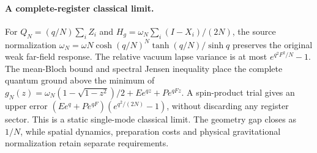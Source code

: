 \paragraph{A complete-register classical limit.}
For $Q_N=(q/N)\sum_i Z_i$ and
$H_g=\omega_N\sum_i(I-X_i)/(2N)$, the source normalization
$\omega_N=\omega N\cosh(q/N)^N\tanh(q/N)/\sinh q$
preserves the original weak far-field response. The relative vacuum lapse
variance is at most $e^{q^2F^2/N}-1$. The mean-Bloch bound and spectral
Jensen inequality place the complete quantum ground above the minimum of
$g_N(z)=\omega_N(1-\sqrt{1-z^2})/2+Ee^{qz}+Pe^{qFz}$.
A spin-product trial gives an upper error
$(Ee^q+Pe^{qF})(e^{q^2/(2N)}-1)$, without discarding any register sector.
This is a static single-mode classical limit. The geometry gap closes as
$1/N$, while spatial dynamics, preparation costs and physical gravitational
normalization retain separate requirements.
